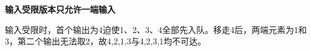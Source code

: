 {\color{ink}\bfseries 输入受限版本只允许一端输入}\par\vspace{1bp}输入受限时，首个输出为4迫使1、2、3、4全部先入队。移走4后，两端元素为1和3，第二个输出无法取2，故4,\allowbreak{}2,\allowbreak{}1,\allowbreak{}3与4,\allowbreak{}2,\allowbreak{}3,\allowbreak{}1均不可达。
